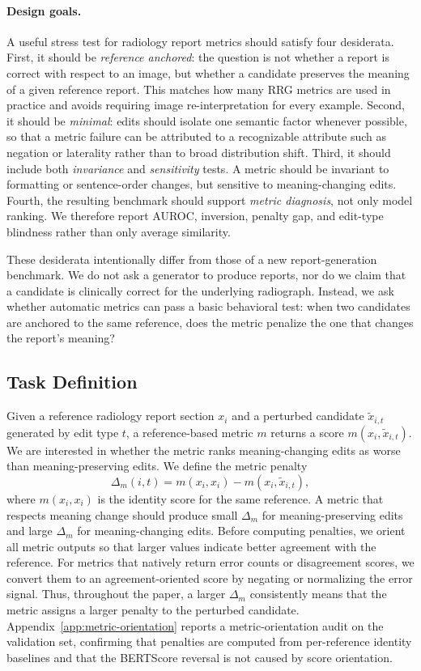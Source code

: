 \documentclass[11pt]{article}
\newcommand{\pres}{meaning-preserving\xspace}
\newcommand{\chg}{meaning-changing\xspace}
\begin{document}
\paragraph{Design goals.}
A useful stress test for radiology report metrics should satisfy four desiderata. First, it should be \emph{reference anchored}: the question is not whether a report is correct with respect to an image, but whether a candidate preserves the meaning of a given reference report. This matches how many RRG metrics are used in practice and avoids requiring image re-interpretation for every example. Second, it should be \emph{minimal}: edits should isolate one semantic factor whenever possible, so that a metric failure can be attributed to a recognizable attribute such as negation or laterality rather than to broad distribution shift. Third, it should include both \emph{invariance} and \emph{sensitivity} tests. A metric should be invariant to formatting or sentence-order changes, but sensitive to meaning-changing edits. Fourth, the resulting benchmark should support \emph{metric diagnosis}, not only model ranking. We therefore report AUROC, inversion, penalty gap, and edit-type blindness rather than only average similarity.

These desiderata intentionally differ from those of a new report-generation benchmark. We do not ask a generator to produce reports, nor do we claim that a candidate is clinically correct for the underlying radiograph. Instead, we ask whether automatic metrics can pass a basic behavioral test: when two candidates are anchored to the same reference, does the metric penalize the one that changes the report's meaning?


\subsection{Task Definition}

Given a reference radiology report section $x_i$ and a perturbed candidate $\tilde{x}_{i,t}$ generated by edit type $t$, a reference-based metric $m$ returns a score $m(x_i,\tilde{x}_{i,t})$. We are interested in whether the metric ranks \chg edits as worse than \pres edits. We define the metric penalty
\begin{equation}
    \Delta_m(i,t) = m(x_i,x_i) - m(x_i,\tilde{x}_{i,t}),
\end{equation}
where $m(x_i,x_i)$ is the identity score for the same reference. A metric that respects meaning change should produce small $\Delta_m$ for \pres edits and large $\Delta_m$ for \chg edits.
Before computing penalties, we orient all metric outputs so that larger values indicate better agreement with the reference. 
For metrics that natively return error counts or disagreement scores, we convert them to an agreement-oriented score by negating or normalizing the error signal. 
Thus, throughout the paper, a larger $\Delta_m$ consistently means that the metric assigns a larger penalty to the perturbed candidate.
Appendix~\ref{app:metric-orientation} reports a metric-orientation audit on the validation set, confirming that penalties are computed from per-reference identity baselines and that the BERTScore reversal is not caused by score orientation.
\end{document}

